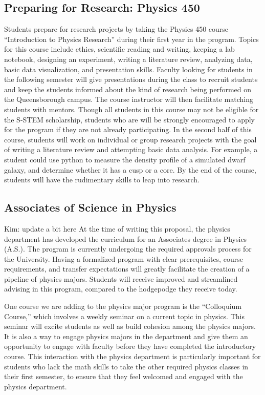 \documentclass[12pt]{article}
\newcommand\new[1]{{\color{blue}#1}}
\begin{document}
\subsection{Preparing for Research: Physics 450}
\vspace{-2mm}
Students prepare for research projects by taking the Physics 450 course ``Introduction to Physics Research'' during their first year in the program.   Topics for this course include ethics, scientific reading and writing, keeping a lab notebook, designing an experiment, writing a literature review, analyzing data, basic data visualization, and presentation skills.  Faculty looking for students in the following semester will give presentations during the class to recruit students and keep the students informed about the kind of research being performed on the Queensborough campus.  The course instructor will then facilitate matching students with mentors.  Though all students in this course may not be eligible for the S-STEM scholarship, students who are will be strongly encouraged to apply for the program if they are not already participating.  In the second half of this course, students will work on individual or group research projects with the goal of writing a literature review and attempting basic data analysis.  For example, a student could use python to measure the density profile of a simulated dwarf galaxy, and determine whether it has a cusp or a core.  By the end of the course, students will have the rudimentary skills to leap into research.  
\vspace{-5mm}

\subsection{Associates of Science in Physics}
\vspace{-2mm}
 \new{Kim: update a bit here}  At the time of writing this proposal, the physics department has developed the curriculum for an Associates degree in Physics (A.S.).  The program is currently undergoing the required approvals process for the University.  Having a formalized program with clear prerequisites, course requirements, and transfer expectations will greatly facilitate the creation of a pipeline of physics majors.  Students will receive improved and streamlined advising in this program, compared to the hodgepodge they receive today.  

One course we are adding to the physics major program is the ``Colloquium Course,'' which involves a weekly seminar on a current topic in physics.  This seminar will excite students as well as build cohesion among the physics majors.  It is also a way to engage physics majors in the department and give them an opportunity to engage with faculty before they have completed the introductory course.  This interaction with the physics department is particularly important for students who lack the math skills to take the other required physics classes in their first semester, to ensure that they feel welcomed and engaged with the physics department.
\vspace{-5mm}
\end{document}
